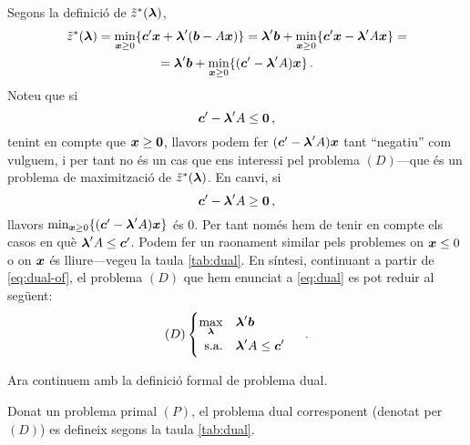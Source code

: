 Segons la definició de $\tilde{z}^\ast(\boldsymbol{\lambda})$,
%
\begin{equation}\label{eq:dual-of}
\begin{gathered}
	\tilde{z}^\ast(\boldsymbol{\lambda})
	= \min_{\boldsymbol{x}\ge 0} \{\boldsymbol{c}'\boldsymbol{x}+\boldsymbol{\lambda}'(\boldsymbol{b}-A\boldsymbol{x})\}
	= \boldsymbol{\lambda}'\boldsymbol{b}+ \min_{\boldsymbol{x}\ge0}\{\boldsymbol{c}'\boldsymbol{x}-\boldsymbol{\lambda}'A\boldsymbol{x}\}=\\
	=  \boldsymbol{\lambda}'\boldsymbol{b}+ \min_{\boldsymbol{x}\ge0}\{(\boldsymbol{c}'-\boldsymbol{\lambda}'A)\boldsymbol{x}\}\,.
\end{gathered}
\end{equation}
%
Noteu que si \[\boldsymbol{c}'-\boldsymbol{\lambda}'A \le \boldsymbol{0}\,,\] tenint en compte que $\boldsymbol{x}\ge\boldsymbol{0}$, llavors podem fer $(\boldsymbol{c}'-\boldsymbol{\lambda}'A)\boldsymbol{x}$ tant ``negatiu'' com vulguem, i per tant no és un cas que ens interessi pel problema $(D)$---que és un problema de maximització de $\tilde{z}^\ast(\boldsymbol{\lambda})$. En canvi, si \[\boldsymbol{c}'-\boldsymbol{\lambda}'A \ge \boldsymbol{0}\,,\] llavors $\min_{\boldsymbol{x}\ge0}\{(\boldsymbol{c}'-\boldsymbol{\lambda}'A)\boldsymbol{x}\}$ és 0. Per tant només hem de tenir en compte els casos en què $\boldsymbol{\lambda}'A \le \boldsymbol{c}'$.  Podem fer un raonament similar pels problemes on $\boldsymbol{x}\le 0$ o on $\boldsymbol{x}$ és lliure---vegeu la taula \ref{tab:dual}. En síntesi, continuant a partir de \eqref{eq:dual-of}, el problema $(D)$ que hem enunciat a \eqref{eq:dual} es pot reduir al següent:
\[
	(D)
	\begin{cases}
	\begin{aligned}
		\max_{\boldsymbol{\lambda}}		&&& \boldsymbol{\lambda}'\boldsymbol{b}\\
		\text{s.a.}				&&& \boldsymbol{\lambda}'A \le \boldsymbol{c}'\\
	\end{aligned}
	\end{cases}\ .
\]

Ara continuem amb la definició formal de problema dual.

\begin{defi}
	Donat un problema primal $(P)$, el problema dual corresponent (denotat per $(D)$) es defineix segons la taula \ref{tab:dual}.
\end{defi}


